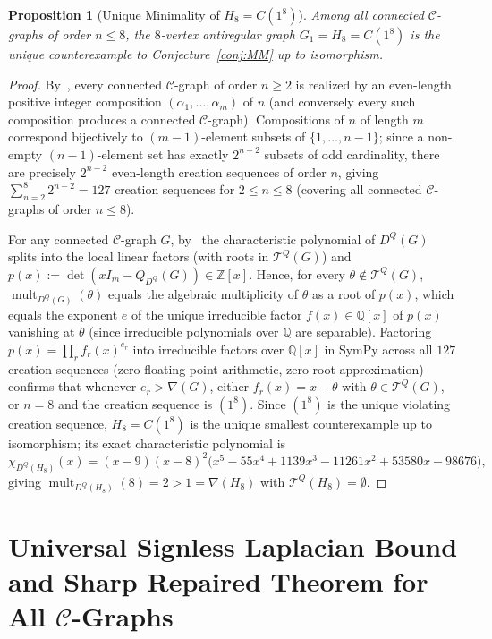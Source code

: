 \documentclass[11pt,a4paper]{article}
\newtheorem{proposition}[theorem]{Proposition}
\theoremstyle{definition}
\DeclareMathOperator{\mult}{mult}
\begin{document}
\begin{proposition}[Unique Minimality of $H_8 = C(1^8)$]\label{prop:minimality}
  Among all connected $\mathcal{C}$-graphs of order $n \le 8$, the $8$-vertex antiregular graph $G_1 = H_8 = C(1^8)$ is the unique counterexample to Conjecture~\ref{conj:MM} up to isomorphism.
\end{proposition}

\begin{proof}
  By~\cite{MM2025}, every connected $\mathcal{C}$-graph of order $n \ge 2$ is realized by an even-length positive integer composition $(\alpha_1,\dots,\alpha_m)$ of $n$ (and conversely every such composition produces a connected $\mathcal{C}$-graph). Compositions of $n$ of length $m$ correspond bijectively to $(m-1)$-element subsets of $\{1,\dots,n-1\}$; since a non-empty $(n-1)$-element set has exactly $2^{n-2}$ subsets of odd cardinality, there are precisely $2^{n-2}$ even-length creation sequences of order $n$, giving $\sum_{n=2}^{8} 2^{n-2} = 127$ creation sequences for $2 \le n \le 8$ (covering all connected $\mathcal{C}$-graphs of order $n \le 8$).

  For any connected $\mathcal{C}$-graph $G$, by~\cite[Theorem~4.3]{MM2026} the characteristic polynomial of $D^Q(G)$ splits into the local linear factors (with roots in $\mathcal{T}^Q(G)$) and $p(x) := \det(xI_m - Q_{D^Q}(G)) \in \mathbb{Z}[x]$. Hence, for every $\theta \notin \mathcal{T}^Q(G)$, $\mult_{D^Q(G)}(\theta)$ equals the algebraic multiplicity of $\theta$ as a root of $p(x)$, which equals the exponent $e$ of the unique irreducible factor $f(x) \in \mathbb{Q}[x]$ of $p(x)$ vanishing at $\theta$ (since irreducible polynomials over $\mathbb{Q}$ are separable). Factoring $p(x) = \prod_r f_r(x)^{e_r}$ into irreducible factors over $\mathbb{Q}[x]$ in SymPy across all $127$ creation sequences (zero floating-point arithmetic, zero root approximation) confirms that whenever $e_r > \nabla(G)$, either $f_r(x) = x - \theta$ with $\theta \in \mathcal{T}^Q(G)$, or $n = 8$ and the creation sequence is $(1^8)$. Since $(1^8)$ is the unique violating creation sequence, $H_8 = C(1^8)$ is the unique smallest counterexample up to isomorphism; its exact characteristic polynomial is
  \[
    \chi_{D^Q(H_8)}(x) = (x - 9)(x - 8)^2\bigl(x^5 - 55x^4 + 1139x^3 - 11261x^2 + 53580x - 98676\bigr),
  \]
  giving $\mult_{D^Q(H_8)}(8) = 2 > 1 = \nabla(H_8)$ with $\mathcal{T}^Q(H_8) = \emptyset$.
\end{proof}

\section{Universal Signless Laplacian Bound and Sharp Repaired Theorem for All $\mathcal{C}$-Graphs}\label{sec:Cgraph_bound}
\end{document}
